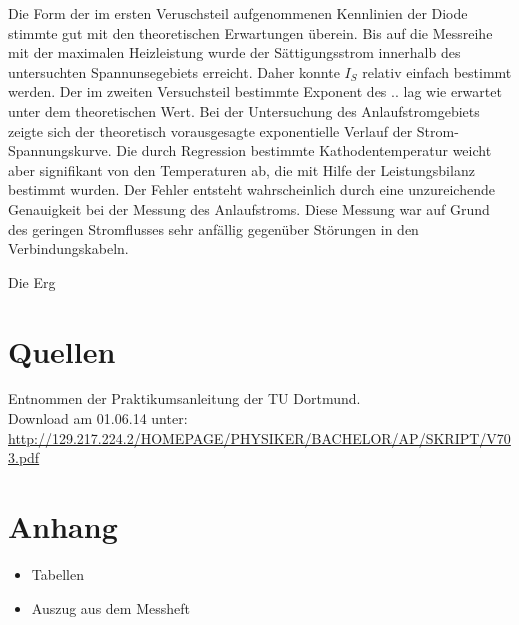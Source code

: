 \documentclass[11pt,ngerman,a4paper]{article}
\begin{document}
Die Form der im ersten Veruschsteil aufgenommenen Kennlinien der Diode stimmte gut mit den theoretischen Erwartungen überein. Bis auf die Messreihe mit der maximalen Heizleistung wurde der S\"attigungsstrom innerhalb des untersuchten Spannunsegebiets erreicht. Daher konnte $I_S$ relativ einfach bestimmt werden. Der im zweiten Versuchsteil bestimmte Exponent des .. lag wie erwartet unter dem theoretischen Wert. Bei der Untersuchung des Anlaufstromgebiets zeigte sich der theoretisch vorausgesagte exponentielle Verlauf der Strom-Spannungskurve. Die durch Regression bestimmte Kathodentemperatur weicht aber signifikant von den Temperaturen ab, die mit Hilfe der Leistungsbilanz bestimmt wurden. Der Fehler entsteht wahrscheinlich durch eine unzureichende Genauigkeit bei der Messung des Anlaufstroms. Diese Messung war auf Grund des geringen Stromflusses sehr anf\"allig gegen\"uber St\"orungen in den Verbindungskabeln. 

\noindent
Die Erg
\section{Quellen}
\begin{enumerate}[{[}1{]}]
\item Entnommen der Praktikumsanleitung \textit{} der TU Dortmund. \\
Download am 01.06.14 unter:\\
 \url{http://129.217.224.2/HOMEPAGE/PHYSIKER/BACHELOR/AP/SKRIPT/V703.pdf}
\end{enumerate}

\section{Anhang}
\begin{itemize}
\item Tabellen
\item Auszug aus dem Messheft
\end{itemize}
\newpage
\end{document}
